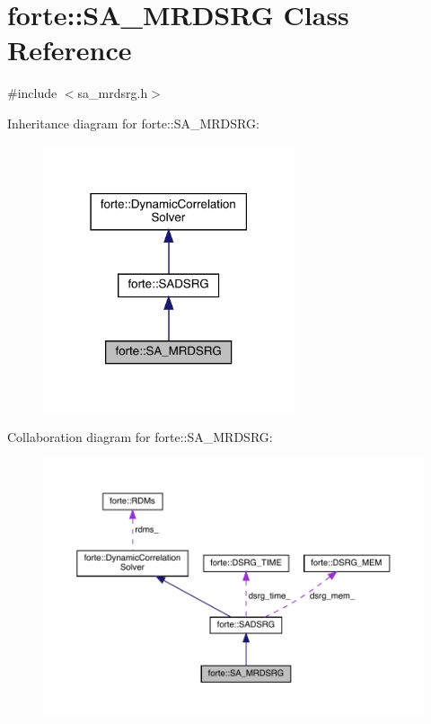 \hypertarget{classforte_1_1_s_a___m_r_d_s_r_g}{}\section{forte\+:\+:S\+A\+\_\+\+M\+R\+D\+S\+RG Class Reference}
\label{classforte_1_1_s_a___m_r_d_s_r_g}


{\ttfamily \#include $<$sa\+\_\+mrdsrg.\+h$>$}



Inheritance diagram for forte\+:\+:S\+A\+\_\+\+M\+R\+D\+S\+RG\+:
\nopagebreak
\begin{figure}[H]
\begin{center}
\leavevmode
\includegraphics[width=210pt]{classforte_1_1_s_a___m_r_d_s_r_g__inherit__graph}
\end{center}
\end{figure}


Collaboration diagram for forte\+:\+:S\+A\+\_\+\+M\+R\+D\+S\+RG\+:
\nopagebreak
\begin{figure}[H]
\begin{center}
\leavevmode
\includegraphics[width=350pt]{classforte_1_1_s_a___m_r_d_s_r_g__coll__graph}
\end{center}
\end{figure}
